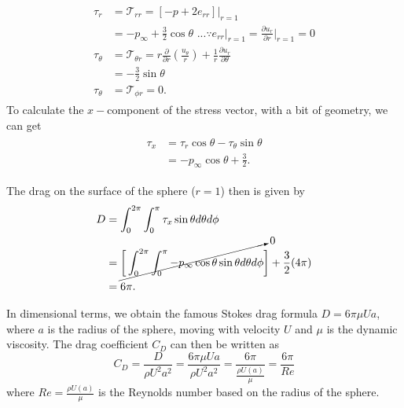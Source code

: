 \documentclass{article}
\begin{document}
\begin{align}\label{eq:stress_vec}
 \begin{split}
  \tau_{r} & = \mathcal{T}_{rr} = [-p + 2 e_{rr}]|_{r=1} \\
  &=  -p_{\infty} + \frac{3}{2}\cos{\theta} \textrm{ ...} \because e_{rr}|_{r=1} = \frac{\partial u_{r}}{\partial r}\bigg|_{r=1} = 0\\
  \tau_{\theta} &= \mathcal{T}_{\theta r} = r \frac{\partial }{\partial r}\left(\frac{u_{\theta}}{r} \right) + \frac{1}{r}\frac{\partial u_{r}}{\partial \theta}\\
  &= -\frac{3}{2}\sin{\theta}\\
  \tau_{\theta} &= \mathcal{T}_{\phi r} = 0.
 \end{split}
\end{align}
To calculate the $x-$component of the stress vector, with a bit of geometry, we can get
\begin{align}
 \begin{split}
  \tau_{x} &= \tau_{r}\cos{\theta} - \tau_{\theta}\sin{\theta}\\
  &=  -p_{\infty} \cos{\theta} + \frac{3}{2}.
 \end{split}
\end{align}
 
The drag on the surface of the sphere ($r=1$) then is given by
\begin{align}\label{eq:dimless_drag}
 \begin{split}
  D &= \int_{0}^{2\pi} \int_{0}^{\pi} \tau_{x} \sin{\theta} d\theta d\phi\\
  &= \cancelto{0}{ \bigg[\int_{0}^{2\pi} \int_{0}^{\pi} -p_{\infty} \cos{\theta} \sin{\theta} d\theta d\phi } \bigg]+ \frac{3}{2} (4 \pi) \\
  &= 6\pi.
 \end{split}
\end{align}

In dimensional terms, we obtain the famous Stokes drag formula $\boxed{D = 6\pi \mu U a}$, where $a$ is the radius of the sphere, moving with velocity $U$ and $\mu$ is the dynamic viscosity. The drag coefficient $C_{D}$ can then be written as 
\begin{equation}\label{eq:cd}
 C_{D} = \frac{D}{\rho U^{2}a^{2}} = \frac{6\pi \mu U a}{ \rho U^{2} a^{2}} = \frac{6\pi}{\frac{\rho U (a)}{\mu}} = \frac{6\pi}{Re}
\end{equation}
where $Re =\frac{\rho U (a)}{\mu}$ is the Reynolds number based on the radius of the sphere.  
\end{document}
